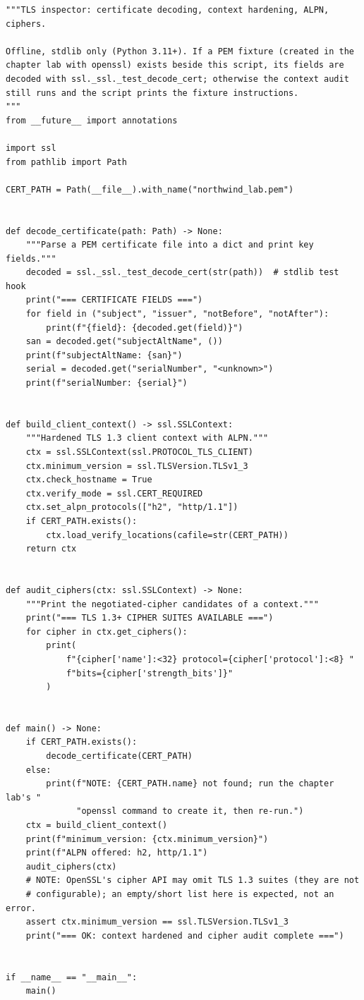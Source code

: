 \begin{verbatim}
"""TLS inspector: certificate decoding, context hardening, ALPN, ciphers.

Offline, stdlib only (Python 3.11+). If a PEM fixture (created in the
chapter lab with openssl) exists beside this script, its fields are
decoded with ssl._ssl._test_decode_cert; otherwise the context audit
still runs and the script prints the fixture instructions.
"""
from __future__ import annotations

import ssl
from pathlib import Path

CERT_PATH = Path(__file__).with_name("northwind_lab.pem")


def decode_certificate(path: Path) -> None:
    """Parse a PEM certificate file into a dict and print key fields."""
    decoded = ssl._ssl._test_decode_cert(str(path))  # stdlib test hook
    print("=== CERTIFICATE FIELDS ===")
    for field in ("subject", "issuer", "notBefore", "notAfter"):
        print(f"{field}: {decoded.get(field)}")
    san = decoded.get("subjectAltName", ())
    print(f"subjectAltName: {san}")
    serial = decoded.get("serialNumber", "<unknown>")
    print(f"serialNumber: {serial}")


def build_client_context() -> ssl.SSLContext:
    """Hardened TLS 1.3 client context with ALPN."""
    ctx = ssl.SSLContext(ssl.PROTOCOL_TLS_CLIENT)
    ctx.minimum_version = ssl.TLSVersion.TLSv1_3
    ctx.check_hostname = True
    ctx.verify_mode = ssl.CERT_REQUIRED
    ctx.set_alpn_protocols(["h2", "http/1.1"])
    if CERT_PATH.exists():
        ctx.load_verify_locations(cafile=str(CERT_PATH))
    return ctx


def audit_ciphers(ctx: ssl.SSLContext) -> None:
    """Print the negotiated-cipher candidates of a context."""
    print("=== TLS 1.3+ CIPHER SUITES AVAILABLE ===")
    for cipher in ctx.get_ciphers():
        print(
            f"{cipher['name']:<32} protocol={cipher['protocol']:<8} "
            f"bits={cipher['strength_bits']}"
        )


def main() -> None:
    if CERT_PATH.exists():
        decode_certificate(CERT_PATH)
    else:
        print(f"NOTE: {CERT_PATH.name} not found; run the chapter lab's "
              "openssl command to create it, then re-run.")
    ctx = build_client_context()
    print(f"minimum_version: {ctx.minimum_version}")
    print(f"ALPN offered: h2, http/1.1")
    audit_ciphers(ctx)
    # NOTE: OpenSSL's cipher API may omit TLS 1.3 suites (they are not
    # configurable); an empty/short list here is expected, not an error.
    assert ctx.minimum_version == ssl.TLSVersion.TLSv1_3
    print("=== OK: context hardened and cipher audit complete ===")


if __name__ == "__main__":
    main()
\end{verbatim}

